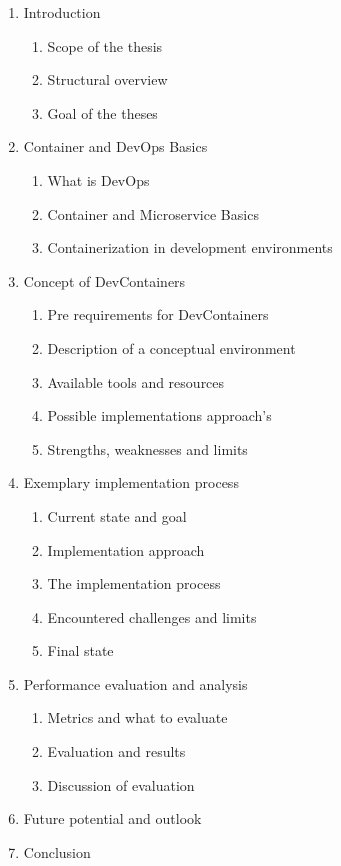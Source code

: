 \documentclass[12pt, a4paper]{article}
\begin{document}
\begin{enumerate}
    \item Introduction
    \begin{enumerate}
        \item Scope of the thesis
        \item Structural overview
        \item Goal of the theses
    \end{enumerate}
    \item Container and DevOps Basics
    \begin{enumerate}
        \item What is DevOps
        \item Container and Microservice Basics
        \item Containerization in development environments
    \end{enumerate}
    \item Concept of DevContainers
    \begin{enumerate}
        \item Pre requirements for DevContainers
        \item Description of a conceptual environment
        \item Available tools and resources
        \item Possible implementations approach's
        \item Strengths, weaknesses and limits
    \end{enumerate}
    \item Exemplary implementation process
    \begin{enumerate}
        \item Current state and goal
        \item Implementation approach
        \item The implementation process
        \item Encountered challenges and limits
        \item Final state
    \end{enumerate}
    \item Performance evaluation and analysis
    \begin{enumerate}
        \item Metrics and what to evaluate
        \item Evaluation and results
        \item Discussion of evaluation
    \end{enumerate}
    \item Future potential and outlook
    \item Conclusion
\end{enumerate}
\end{document}
